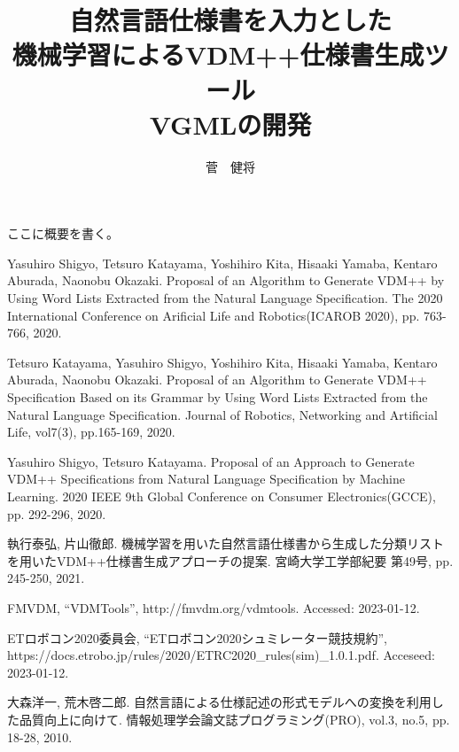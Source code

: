 \documentclass[uplatex, report, a4j, 10pt]{jsbook}
\title{自然言語仕様書を入力とした\\機械学習によるVDM++仕様書生成ツール\\VGMLの開発}
\author{菅　健将}
\begin{document}
\maketitle

%
% 
ここに概要を書く。


%
% 








%


%
\begin{thebibliography}{10}
	    
    Yasuhiro Shigyo, Tetsuro Katayama, Yoshihiro Kita, Hisaaki Yamaba, Kentaro Aburada, Naonobu Okazaki. 
    Proposal of an Algorithm to Generate VDM++ by Using Word Lists Extracted from the Natural Language Speciﬁcation. 
    The 2020 International Conference on Arificial Life and Robotics(ICAROB 2020), 
    pp. 763-766, 2020.
    
    Tetsuro Katayama, Yasuhiro Shigyo, Yoshihiro Kita, Hisaaki Yamaba, Kentaro Aburada, Naonobu Okazaki. 
    Proposal of an Algorithm to Generate VDM++ Speciﬁcation Based on its Grammar by Using Word Lists Extracted from the Natural Language Speciﬁcation. 
    Journal of Robotics, Networking and Artiﬁcial Life, vol7(3), pp.165-169, 2020.

     Yasuhiro Shigyo, Tetsuro Katayama. 
    Proposal of an Approach to Generate VDM++ Speciﬁcations from Natural Language Speciﬁcation by Machine Learning. 
    2020 IEEE 9th Global Conference on Consumer Electronics(GCCE), 
    pp. 292-296, 2020.

    執行泰弘, 片山徹郎. 
    機械学習を用いた自然言語仕様書から生成した分類リストを用いたVDM++仕様書生成アプローチの提案. 
    宮崎大学工学部紀要 第49号, 
    pp. 245-250, 2021.

    FMVDM, “VDMTools”, http:\slash \slash fmvdm.org\slash vdmtools. Accessed: 2023-01-12.

    ETロボコン2020委員会,  “ETロボコン2020シュミレーター競技規約”, https:\slash \slash docs.etrobo.jp\slash rules\slash 2020\slash ETRC2020\_rules(sim)\_1.0.1.pdf. Acceseed: 2023-01-12.

    大森洋一, 荒木啓二郎. 
    自然言語による仕様記述の形式モデルへの変換を利用した品質向上に向けて. 
    情報処理学会論文誌プログラミング(PRO), 
    vol.3, no.5, pp. 18-28, 2010.


\end{thebibliography}
\end{document}
